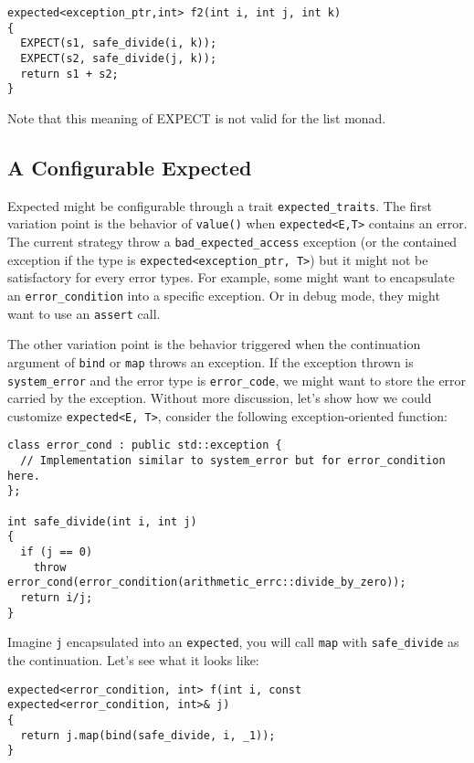 \documentclass[a4paper,10pt]{article}
\newcommand{\cpp}[1]{\lstinline{#1}}
\begin{document}
\begin{lstlisting}
expected<exception_ptr,int> f2(int i, int j, int k)
{
  EXPECT(s1, safe_divide(i, k));
  EXPECT(s2, safe_divide(j, k));
  return s1 + s2;
}
\end{lstlisting}

Note that this meaning of EXPECT is not valid for the list monad. 

\subsection{A Configurable Expected}
\label{configurable-expected}

Expected might be configurable through a trait \cpp{expected_traits}. The first variation point is the behavior of \cpp{value()} when \cpp{expected<E,T>} contains an error. The current strategy throw a \cpp{bad_expected_access} exception (or the contained exception if the type is \cpp{expected<exception_ptr, T>}) but it might not be satisfactory for every error types. For example, some might want to encapsulate an \cpp{error_condition} into a specific exception. Or in debug mode, they might want to use an \cpp{assert} call.

The other variation point is the behavior triggered when the continuation argument of \cpp{bind} or \cpp{map} throws an exception. If the exception thrown is \cpp{system_error} and the error type is \cpp{error_code}, we might want to store the error carried by the exception. Without more discussion, let's show how we could customize \cpp{expected<E, T>}, consider the following exception-oriented function:

\begin{lstlisting}
class error_cond : public std::exception {
  // Implementation similar to system_error but for error_condition here.
};

int safe_divide(int i, int j)
{
  if (j == 0) 
    throw error_cond(error_condition(arithmetic_errc::divide_by_zero));
  return i/j;
}
\end{lstlisting}

\noindent
Imagine \cpp{j} encapsulated into an \cpp{expected}, you will call \cpp{map} with \cpp{safe_divide} as the continuation. Let's see what it looks like:

\begin{lstlisting}
expected<error_condition, int> f(int i, const expected<error_condition, int>& j)
{
  return j.map(bind(safe_divide, i, _1));
}
\end{lstlisting}
\end{document}
